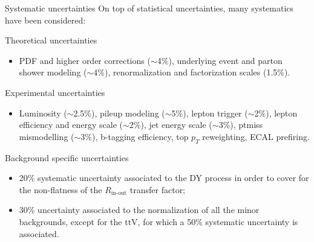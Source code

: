 \documentclass[8pt]{beamer}
\begin{document}
\begin{frame}{Systematic uncertainties}
\justifying
On top of statistical uncertainties, \alert{many systematics} have been considered: \vfill

\begin{block}{\centering Theoretical uncertainties}\end{block} 

\begin{itemize}
\justifying
\item PDF and higher order corrections ($\sim$4\%), underlying event and parton shower modeling ($\sim$4\%), renormalization and factorization scales (1.5\%).
\end{itemize} \vfill

\begin{block}{\centering Experimental uncertainties}\end{block}

\begin{itemize}
\justifying
\item Luminosity ($\sim$2.5\%), pileup modeling ($\sim$5\%), lepton trigger ($\sim$2\%), lepton efficiency and energy scale ($\sim$2\%), jet energy scale ($\sim$3\%), ptmiss mismodelling ($\sim$3\%), b-tagging efficiency, top $p_T$ reweighting, ECAL prefiring.
\end{itemize} \vfill

\begin{block}{\centering Background specific uncertainties}\end{block}

\begin{itemize}
\justifying
\item 20\% systematic uncertainty associated to the DY process in order to cover for the non-flatness of the $R_{\text{in-out}}$ transfer factor;
\item 30\% uncertainty associated to the normalization of all the minor backgrounds, except for the ttV, for which a 50\% systematic uncertainty is associated.
\end{itemize} \vfill
\end{frame}
\end{document}
